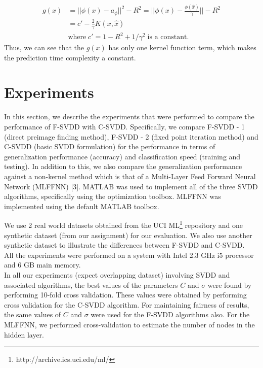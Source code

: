 \documentclass{article} %
\begin{document}
\begin{equation}
\begin{split}
g(x) &= || \phi(x) - a_\phi||^2 - R^2 = ||\phi(x) - \frac{\phi(\hat{x})}{\gamma} || - R^2 \\
 &=   c' - \frac{2}{\gamma} K(x,\hat{x}) \\
 & \text{where}\;  c' = 1- R^2 + 1/\gamma^2 \; \text{is a constant}.
\end{split}
\end{equation}
Thus, we can see that the $g(x)$ has only one kernel function term, which makes the prediction time complexity a constant. 

\section{Experiments}
In this section, we describe the experiments that were performed to compare the performance of F-SVDD with C-SVDD. Specifically, we compare F-SVDD - 1 (direct preimage finding method), F-SVDD - 2 (fixed point iteration method) and C-SVDD (basic SVDD formulation) for the performance in terms of generalization performance (accuracy) and classification speed (training and testing). In addition to this, we also compare the generalization performance against a non-kernel method which is that of a Multi-Layer Feed Forward Neural Network (MLFFNN) [3]. MATLAB was used to implement all of the three SVDD algorithms, specifically using the optimization toolbox. MLFFNN was implemented using the default MATLAB toolbox. 

We use 2 real world datasets obtained from the UCI ML\footnote{http://archive.ics.uci.edu/ml/} repository and one synthetic dataset (from our assignment) for our evaluation. We also use another synthetic dataset to illustrate the differences between F-SVDD and C-SVDD. \\[5pt]

All the experiments were performed on a system with Intel 2.3 GHz i5 processor and 6 GB main memory. \\[5pt]


In all our experiments (expect overlapping dataset) involving SVDD and associated algorithms, the best values of the parameters $C$ and $\sigma$ were found by performing 10-fold cross validation. These values were obtained by performing cross validation for the C-SVDD algorithm. For maintaining fairness of results, the same values of $C$ and $\sigma$ were used for the F-SVDD algorithms also. For the MLFFNN, we performed cross-validation to estimate the number of nodes in the hidden layer. \\[5pt]
\end{document}
